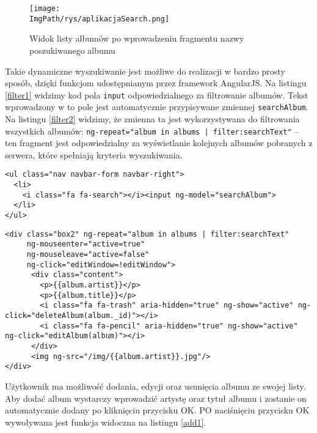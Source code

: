 \documentclass[a4paper,12pt,twoside,openany]{report}
\newcommand{\ImgPath}{.}
\begin{document}
\begin{figure}[!htbp]
	\begin{center}
\centering
\texttt{[image: \\ImgPath/rys/aplikacjaSearch.png]}
\end{center}
	\caption{Widok listy albumów po wprowadzeniu fragmentu nazwy poszukiwanego albumu}
	\label{aplikacjaSearch}
\end{figure}

Takie dynamiczne wyszukiwanie jest możliwe do realizacji w bardzo prosty sposób, dzięki funkcjom udostępnianym przez framework AngularJS.
Na listingu \ref{filter1} widzimy kod pola \texttt{input} odpowiedzialnego za filtrowanie albumów.
Tekst wprowadzony w to pole jest automatycznie przypisywane zmiennej \texttt{searchAlbum}.
Na listingu \ref{filter2} widzimy, że zmienna ta jest wykorzystywana do filtrowania wszystkich albumów: \texttt{ng-repeat="album in albums | filter:searchText"} -- ten fragment jest odpowiedzialny za wyświetlanie kolejnych albumów pobranych z serwera, które spełniają kryteria wyszukiwania.

\begin{lstlisting}[caption=Kod filtra w pasku nawigacyjnym aplikacji, label=filter1]
<ul class="nav navbar-form navbar-right">
  <li>
    <i class="fa fa-search"></i><input ng-model="searchAlbum">
  </li>
</ul>
\end{lstlisting}
\begin{lstlisting}[caption=Kod odpowiedzialny za wyświetlanie albumów, label=filter2]
<div class="box2" ng-repeat="album in albums | filter:searchText"
     ng-mouseenter="active=true"
     ng-mouseleave="active=false"
     ng-click="editWindow=!editWindow">
      <div class="content">
        <p>{{album.artist}}</p>
        <p>{{album.title}}</p>
        <i class="fa fa-trash" aria-hidden="true" ng-show="active" ng-click="deleteAlbum(album._id)"></i>
        <i class="fa fa-pencil" aria-hidden="true" ng-show="active" ng-click="editAlbum(album)"></i>
      </div>
      <img ng-src="/img/{{album.artist}}.jpg"/>
</div>
\end{lstlisting}

Użytkownik ma możliwość dodania, edycji oraz usunięcia albumu ze swojej listy.
Aby dodać album wystarczy wprowadzić artystę oraz tytuł albumu i zostanie on automatycznie dodany po kliknięciu przycisku OK.
PO naciśnięciu przycisku OK wywoływana jest funkcja widoczna na listingu \ref{add1}.

\begin{lstlisting}[caption=Kod odpowiedzialny za dodanie albumu od strony użytkownika, label=add1]

\end{lstlisting}
\end{document}
